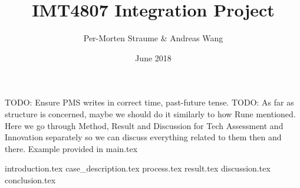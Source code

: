 \documentclass{article}
\title{IMT4807 Integration Project}
\author{Per-Morten Straume \& Andreas Wang}
\date{June 2018}
\newcommand{\todo}[1]{{\color{blue}TODO: #1}}
\begin{document}
\maketitle



\todo{Ensure PMS writes in correct time, past-future tense.}
\todo{As far as structure is concerned, maybe we should do it similarly to how Rune mentioned. Here we go through Method, Result and Discussion for Tech Assessment and Innovation separately so we can discuss everything related to them then and there. Example provided in main.tex}


{introduction.tex}
{case_description.tex}
{process.tex} %
{result.tex}
{discussion.tex}
{conclusion.tex}




\end{document}
